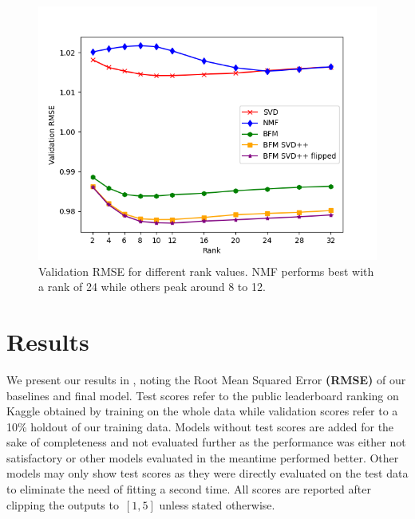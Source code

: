 \documentclass[10pt,conference,compsocconf]{IEEEtran}
\begin{document}
    \begin{figure}
        \includegraphics[width=\columnwidth]{figures/rank.png}
        \caption{Validation RMSE for different rank values.
        NMF performs best with a rank of 24 while others peak around 8 to 12.}
        \label{fig:rank}
    \end{figure}


    \section{Results}
    We present our results in , noting the Root Mean Squared Error \textbf{(RMSE)} of our baselines and final model.
    Test scores refer to the public leaderboard ranking on Kaggle obtained by training on the whole data while validation scores refer to a 10\% holdout of our training data.
    Models without test scores are added for the sake of completeness and not evaluated further as the performance was either not satisfactory or other models evaluated in the meantime performed better.
    Other models may only show test scores as they were directly evaluated on the test data to eliminate the need of
    fitting a second time.
    All scores are reported after clipping the outputs to~$[1, 5]$ unless stated otherwise.
\end{document}

